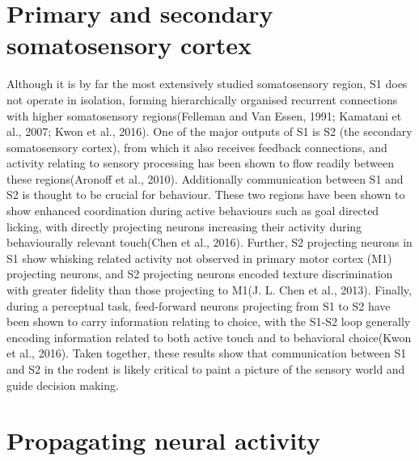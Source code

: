 \section{Primary and secondary somatosensory cortex}

Although it is by far the most extensively studied somatosensory region, S1 does not operate in isolation, forming hierarchically organised recurrent connections with higher somatosensory regions(Felleman and Van Essen, 1991; Kamatani et al., 2007; Kwon et al., 2016). One of the major outputs of S1 is S2 (the secondary somatosensory cortex), from which it also receives feedback connections, and activity relating to sensory processing has been shown to flow readily between these regions(Aronoff et al., 2010). Additionally communication between S1 and S2 is thought to be crucial for behaviour. These two regions have been shown to show enhanced coordination during active behaviours such as goal directed licking, with directly projecting neurons increasing their activity during behaviourally relevant touch(Chen et al., 2016). Further, S2 projecting neurons in S1 show whisking related activity not observed in primary motor cortex (M1) projecting neurons, and S2 projecting neurons encoded texture discrimination with greater fidelity than those projecting to M1(J. L. Chen et al., 2013). Finally, during a perceptual task, feed-forward neurons projecting from S1 to S2 have been shown to carry information relating to choice, with the S1-S2 loop generally encoding information related to both active touch and to behavioral choice(Kwon et al., 2016). Taken together, these results show that communication between S1 and S2 in the rodent is likely critical to paint a picture of the sensory world and guide decision making.  

\section{Propagating neural activity}

